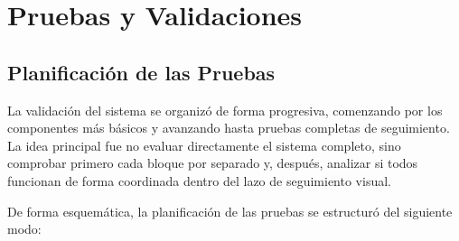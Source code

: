 \clearpage

\chapter*{Pruebas y Validaciones}

\vspace{-1.5cm}
\noindent\HRule\par\vspace{0.1cm}




\section{Planificación de las Pruebas}

La validación del sistema se organizó de forma progresiva, comenzando por los componentes más básicos y avanzando hasta pruebas completas de seguimiento. La idea principal fue no evaluar directamente el sistema completo, sino comprobar primero cada bloque por separado y, después, analizar si todos funcionan de forma coordinada dentro del lazo de seguimiento visual.

\vspace{0.3cm}

De forma esquemática, la planificación de las pruebas se estructuró del siguiente modo:

